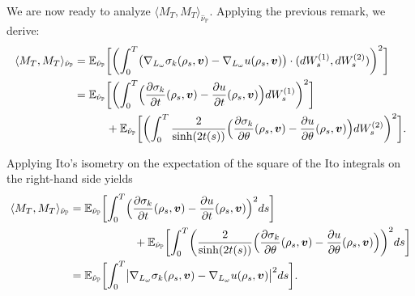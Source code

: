 \documentclass[JEP,XML,SOM,Unicode,published]{cedram}
\theoremstyle{plain}
\theoremstyle{definition}
\numberwithin{equation}{subsection}
\newcommand\bE{\mathbb{E}}
\newcommand\bP{\mathbb{P}}
\let\gradient\nabla
\newcommand{\bfv}{\boldsymbol{v}}
\newcommand{\bbE}[1]{\bE_{\hat{\nu}_\bP}\biggl[ #1 \biggr]}
\begin{document}
We are now ready to analyze $\langle M_T, M_T\rangle_{\hat{\nu}_\bP}$. Applying the previous remark, we derive:
\begin{align*}
\langle M_T, M_T\rangle_{\hat{\nu}_\bP} &= \bbE{\biggl(\int_0^T \bigl(\gradient_{L_\omega}\sigma_k(\rho_s,\bfv)-\gradient_{L_\omega}u(\rho_s,\bfv) \bigr) \cdot (dW^{(1)}_s,dW^{(2)}_s)\biggr)^2} \\
&= \bbE{\biggl(\int_0^T \Bigl(\frac{\partial \sigma_k}{\partial t}(\rho_s,\bfv)-\frac{\partial u}{\partial t}(\rho_s,\bfv) \Bigr) dW^{(1)}_s\biggr)^2}\\
&\hspace*{1cm}+ \bbE{\biggl(\int_0^T \frac{2}{\sinh(2t(s))} \Bigl(\frac{\partial \sigma_k}{\partial \theta}(\rho_s,\bfv)-\frac{\partial u}{\partial \theta}(\rho_s,\bfv) \Bigr) dW^{(2)}_s\biggr)^2}.
\end{align*}

Applying Ito's isometry on the expectation of the square of the Ito integrals on the right-hand side yields
\begin{align*}
\langle M_T, M_T\rangle_{\hat{\nu}_\bP} &= \bbE{\int_0^T \Bigl(\frac{\partial \sigma_k}{\partial t}(\rho_s,\bfv)- \frac{\partial u}{\partial t}(\rho_s,\bfv) \Bigr)^2 ds}\\
&\hspace*{2cm}+ \bbE{\int_0^T \biggl(\frac{2}{\sinh(2t(s))} \Bigl(\frac{\partial \sigma_k}{\partial \theta}(\rho_s,\bfv)- \frac{\partial u}{\partial \theta}(\rho_s,\bfv) \Bigr)\biggr)^2 ds} \\
&= \bbE{\int_0^T \bigl| \gradient_{L_\omega}\sigma_k(\rho_s,\bfv)-\gradient_{L_\omega}u(\rho_s,\bfv)\bigr|^2ds}.
\end{align*}
\end{document}
